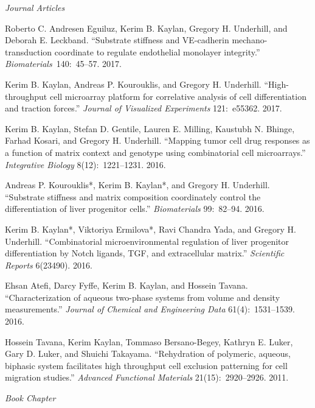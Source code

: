 \documentclass[11pt,article,oneside]{memoir}
\begin{document}
\noindent\emph{Journal Articles \vspace{0.05in}}

\ind Roberto C. Andresen Eguiluz, Kerim B. Kaylan, Gregory H. Underhill, and Deborah E. Leckband. ``Substrate stiffness and VE-cadherin mechano-transduction coordinate to regulate endothelial monolayer integrity.'' \emph{Biomaterials}~140:~45--57. 2017.

\ind Kerim B. Kaylan, Andreas P. Kourouklis, and Gregory H. Underhill. ``High-throughput cell microarray platform for correlative analysis of cell differentiation and traction forces.'' \emph{Journal of Visualized Experiments} 121:~e55362. 2017.

\ind Kerim B. Kaylan, Stefan D. Gentile, Lauren E. Milling, Kaustubh N. Bhinge, Farhad Kosari, and Gregory H. Underhill. ``Mapping tumor cell drug responses as a function of matrix context and genotype using combinatorial cell microarrays.'' \emph{Integrative Biology} 8(12):~1221--1231. 2016.

\ind Andreas P. Kourouklis*, Kerim B. Kaylan*, and Gregory H. Underhill. ``Substrate stiffness and matrix composition coordinately control the differentiation of liver progenitor cells.'' \emph{Biomaterials} 99:~82--94. 2016.

\ind Kerim B. Kaylan*, Viktoriya Ermilova*, Ravi Chandra Yada, and Gregory H. Underhill. ``Combinatorial microenvironmental regulation of liver progenitor differentiation by Notch ligands, TGF\textbeta, and extracellular matrix.'' \emph{Scientific Reports} 6(23490). 2016.

\ind Ehsan Atefi, Darcy Fyffe, Kerim B. Kaylan, and Hossein Tavana. ``Characterization of aqueous two-phase systems from volume and density measurements.'' \emph{Journal of Chemical and Engineering Data} 61(4):~1531--1539. 2016.

\ind Hossein Tavana, Kerim Kaylan, Tommaso Bersano-Begey, Kathryn E. Luker, Gary D. Luker, and Shuichi Takayama. ``Rehydration of polymeric, aqueous, biphasic system facilitates high throughput cell exclusion patterning for cell migration studies.'' \emph{Advanced Functional Materials} 21(15):~2920--2926. 2011.


\bigskip

\noindent\textit{Book Chapter \vspace{0.05in}}
\end{document}
